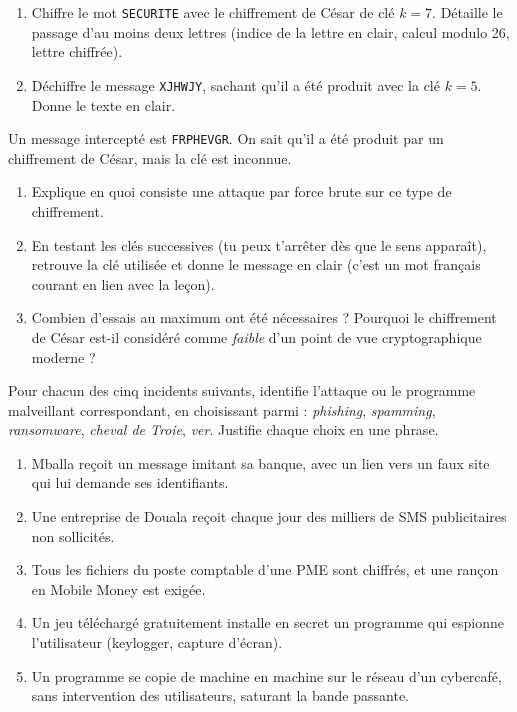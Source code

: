 \documentclass[11pt]{article}
\newcommand{\cle}[1]{{\popxbold\color{popdark}#1}}
\newcounter{popsec}
\newcounter{popsub}
\newcommand{\courssub}[1]{%
  \stepcounter{popsub}%
  \par\vspace{9pt}\noindent{\popxbold\fontsize{11.5}{13}\selectfont\color{popink}{\color{poporange}\thepopsec.\thepopsub}\hspace{6pt}#1}\par\nopagebreak\vspace{4pt}
}
\begin{document}
\courssub{Je m'entraîne}

\begin{exercice}
\begin{enumerate}
\item Chiffre le mot \texttt{SECURITE} avec le chiffrement de César de clé $k = 7$. Détaille le passage d'au moins deux lettres (indice de la lettre en clair, calcul modulo 26, lettre chiffrée).
\item Déchiffre le message \texttt{XJHWJY}, sachant qu'il a été produit avec la clé $k = 5$. Donne le texte en clair.
\end{enumerate}
\end{exercice}

\begin{exercice}
Un message intercepté est \texttt{FRPHEVGR}. On sait qu'il a été produit par un chiffrement de César, mais la clé est inconnue.
\begin{enumerate}
\item Explique en quoi consiste une attaque par \cle{force brute} sur ce type de chiffrement.
\item En testant les clés successives (tu peux t'arrêter dès que le sens apparaît), retrouve la clé utilisée et donne le message en clair (c'est un mot français courant en lien avec la leçon).
\item Combien d'essais au maximum ont été nécessaires ? Pourquoi le chiffrement de César est-il considéré comme \emph{faible} d'un point de vue cryptographique moderne ?
\end{enumerate}
\end{exercice}

\begin{exercice}
Pour chacun des cinq incidents suivants, identifie l'attaque ou le programme malveillant correspondant, en choisissant parmi : \emph{phishing}, \emph{spamming}, \emph{ransomware}, \emph{cheval de Troie}, \emph{ver}. Justifie chaque choix en une phrase.
\begin{enumerate}
\item Mballa reçoit un message imitant sa banque, avec un lien vers un faux site qui lui demande ses identifiants.
\item Une entreprise de Douala reçoit chaque jour des milliers de SMS publicitaires non sollicités.
\item Tous les fichiers du poste comptable d'une PME sont chiffrés, et une rançon en Mobile Money est exigée.
\item Un jeu téléchargé gratuitement installe en secret un programme qui espionne l'utilisateur (keylogger, capture d'écran).
\item Un programme se copie de machine en machine sur le réseau d'un cybercafé, sans intervention des utilisateurs, saturant la bande passante.
\end{enumerate}
\end{exercice}
\end{document}
